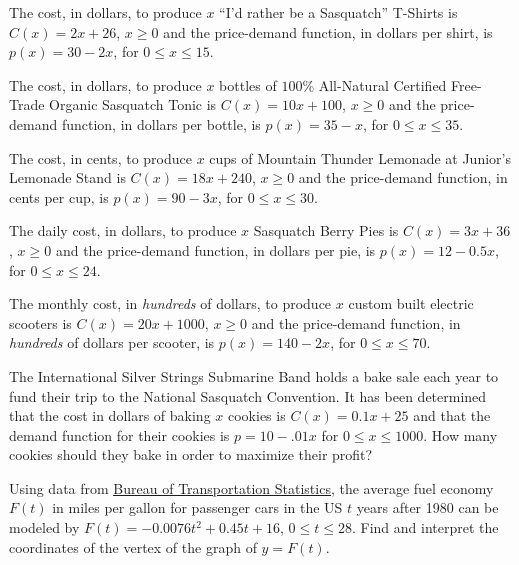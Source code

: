 \begin{exenum}

\item  The cost, in dollars, to produce $x$ ``I'd rather be a Sasquatch'' T-Shirts is $C(x) = 2x+26$, $x \geq 0$ and the price-demand function, in dollars per shirt,  is $p(x) = 30 - 2x$, for $0 \leq x \leq 15$. \label{maxprofitfirst}

\item  The cost, in dollars, to produce $x$ bottles of $100 \%$ All-Natural Certified Free-Trade Organic Sasquatch Tonic is $C(x) = 10x+100$, $x \geq 0$ and the price-demand function, in dollars per bottle,  is $p(x) = 35 - x$, for $0 \leq x \leq 35$.

\item  The cost, in cents, to produce $x$ cups of Mountain Thunder Lemonade at Junior's Lemonade Stand  is $C(x) = 18x + 240$, $x \geq 0$ and the price-demand function, in cents per cup,  is $p(x) = 90-3x$, for $0 \leq x \leq 30$.

\item  The daily cost, in dollars, to produce $x$ Sasquatch Berry Pies is $C(x) = 3x + 36$, $x \geq 0$ and the price-demand function, in  dollars per pie,  is $p(x) = 12-0.5x$, for $0 \leq x \leq 24$.

\item  The monthly cost, in \emph{hundreds} of dollars, to produce $x$ custom built electric scooters is $C(x) = 20x + 1000$, $x \geq 0$ and the price-demand function, in \emph{hundreds} of dollars per scooter,  is $p(x) = 140-2x$, for $0 \leq x \leq 70$. \label{maxprofitlast}

\item The International Silver Strings Submarine Band holds a bake sale each year to fund their trip to the National Sasquatch Convention.  It has been determined that the cost in dollars of baking $x$ cookies is $C(x) = 0.1x + 25$ and that the demand function for their cookies is $p = 10 - .01x$ for $0 \leq x \leq 1000$.  How many cookies should they bake in order to maximize their profit?

\item Using data from \href{http://www.bts.gov/publications/national_transportation_statistics/html/table_04_23.html}{\underline{Bureau of Transportation Statistics}}, the average fuel economy $F(t)$ in miles per gallon for passenger cars in the US $t$ years after 1980 can be modeled by  $F(t) = -0.0076t^2+0.45t + 16$, $0 \leq t \leq 28$. Find and interpret the coordinates of the vertex of the graph of $y = F(t)$.


\end{exenum}
